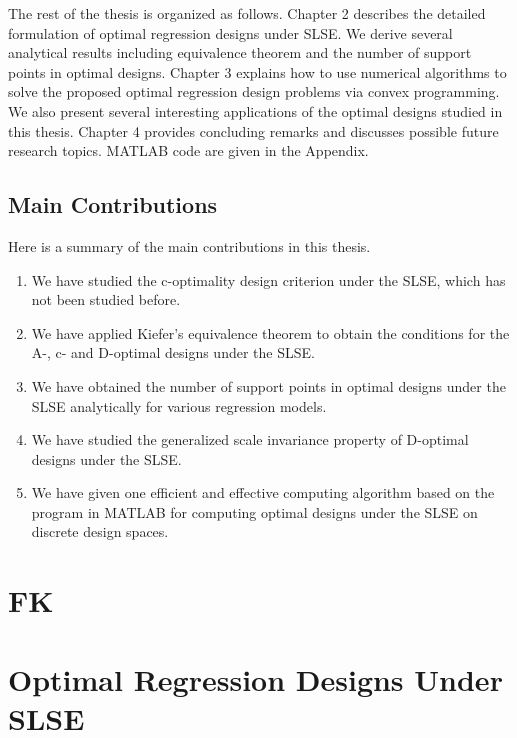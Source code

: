 \documentclass[
]{book}
\theoremstyle{definition}
\theoremstyle{definition}
\theoremstyle{definition}
\theoremstyle{definition}
\theoremstyle{remark}
\begin{document}
The rest of the thesis is organized as follows. Chapter 2 describes the detailed formulation of optimal regression designs under SLSE. We derive several analytical results including equivalence theorem and the number of support points in optimal designs. Chapter 3 explains how to use numerical algorithms to solve the proposed optimal regression design problems via convex programming. We also present several interesting applications of the optimal designs studied in this thesis. Chapter 4 provides concluding remarks and discusses possible future research topics. MATLAB code are given in the Appendix.

\section{Main Contributions}\label{main-contributions}

Here is a summary of the main contributions in this thesis.

\begin{enumerate}
\def\labelenumi{\arabic{enumi}.}
\item
  We have studied the c-optimality design criterion under the SLSE, which has not been studied before.
\item
  We have applied Kiefer's equivalence theorem \citep{kiefer1974general} to obtain the conditions for the A-, c- and D-optimal designs under the SLSE.
\item
  We have obtained the number of support points in optimal designs under the SLSE analytically for various regression models.
\item
  We have studied the generalized scale invariance property of D-optimal designs under the SLSE.
\item
  We have given one efficient and effective computing algorithm based on the program in MATLAB for computing optimal designs under the SLSE on discrete design spaces.
\end{enumerate}

\chapter{FK}\label{fk}

\chapter{Optimal Regression Designs Under SLSE}\label{chapter-SLSE}
\end{document}
